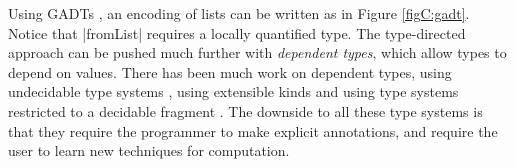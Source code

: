 Using GADTs \cite{spj:gadt}, an encoding of lists can be written as in Figure \ref{figC:gadt}. Notice that |fromList| requires a locally quantified type. The type-directed approach can be pushed much further with \textit{dependent types}, which allow types to depend on values. There has been much work on dependent types, using undecidable type systems \cite{epigram}, using extensible kinds \cite{omega} and using type systems restricted to a decidable fragment \cite{xi:dependent_practical}. The downside to all these type systems is that they require the programmer to make explicit annotations, and require the user to learn new techniques for computation.


